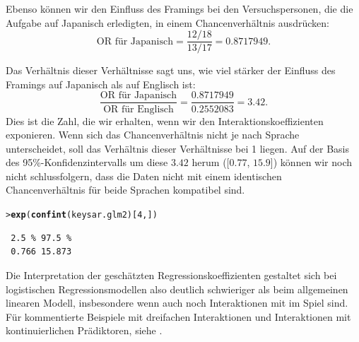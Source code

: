 \documentclass[oneside, 10pt]{book}\usepackage[]{graphicx}\usepackage[]{xcolor}
\makeatletter
\newcommand{\hlnum}[1]{\textcolor[rgb]{0.686,0.059,0.569}{#1}}%
\newcommand{\hlstd}[1]{\textcolor[rgb]{0.345,0.345,0.345}{#1}}%
\newcommand{\hlkwd}[1]{\textcolor[rgb]{0.737,0.353,0.396}{\textbf{#1}}}%
\newenvironment{kframe}{%
 \def\at@end@of@kframe{}%
 \ifinner\ifhmode%
  \def\at@end@of@kframe{\end{minipage}}%
  \begin{minipage}{\columnwidth}%
 \fi\fi%
 \def\FrameCommand##1{\hskip\@totalleftmargin \hskip-\fboxsep
 \colorbox{shadecolor}{##1}\hskip-\fboxsep
     \hskip-\linewidth \hskip-\@totalleftmargin \hskip\columnwidth}%
 \MakeFramed {\advance\hsize-\width
   \@totalleftmargin\z@ \linewidth\hsize
   \@setminipage}}%
 {\par\unskip\endMakeFramed%
 \at@end@of@kframe}
\newenvironment{knitrout}{}{} %
\makeatother
\begin{document}
\begin{itemize}
Ebenso können wir den Einfluss des Framings bei den Versuchspersonen,
die die Aufgabe auf Japanisch erledigten, in einem Chancenverhältnis ausdrücken:
\[
  \textrm{OR für Japanisch} = \frac{12\Big/18}{13\Big/17} = 0.8717949.
  \]

Das Verhältnis dieser Verhältnisse sagt uns, wie viel stärker der Einfluss
des Framings auf Japanisch als auf Englisch ist:
\[
  \frac{\textrm{OR für Japanisch}}{\textrm{OR für Englisch}} = \frac{0.8717949}{0.2552083} = 3.42.
\]
Dies ist die Zahl, die wir erhalten, wenn wir den Interaktionskoeffizienten exponieren.
Wenn sich das Chancenverhältnis nicht je nach Sprache unterscheidet, soll das Verhältnis
dieser Verhältnisse bei 1 liegen. Auf der Basis des 95\%-Konfidenzintervalls um
diese $3.42$ herum ([$0.77$, $15.9$]) können wir noch nicht schlussfolgern, dass
die Daten nicht mit einem identischen Chancenverhältnis für beide Sprachen kompatibel sind.
\begin{knitrout}
\color{fgcolor}\begin{kframe}
\begin{alltt}
\hlstd{> }\hlkwd{exp}\hlstd{(}\hlkwd{confint}\hlstd{(keysar.glm2)[}\hlnum{4}\hlstd{, ])}
\end{alltt}


{\ttfamily\noindent\itshape\color{messagecolor}{Waiting for profiling to be done...}}\begin{verbatim}
 2.5 % 97.5 % 
 0.766 15.873 
\end{verbatim}
\end{kframe}
\end{knitrout}
\end{itemize}

Die Interpretation der geschätzten Regressionskoeffizienten
gestaltet sich bei logistischen Regressionsmodellen also deutlich
schwieriger als beim allgemeinen linearen Modell, insbesondere
wenn auch noch Interaktionen mit im Spiel sind.
Für kommentierte Beispiele mit dreifachen Interaktionen und
Interaktionen mit kontinuierlichen Prädiktoren, siehe
\citet{Jaccard2001}.
\end{document}
